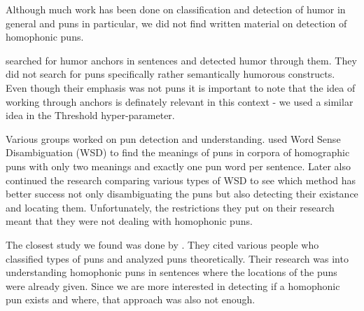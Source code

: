 \documentclass[11pt,a4paper]{article}
\begin{document}
Although much work has been done on classification and detection of humor in general and puns in particular, we did not find written material on detection of homophonic puns.

\citet{yang_lavie_dyer_hovy_2015} searched for humor anchors in sentences and detected humor through them. They did not search for puns specifically rather semantically humorous constructs. Even though their emphasis was not puns it is important to note that the idea of working through anchors is definately relevant in this context - we used a similar idea in the Threshold hyper-parameter.

Various groups worked on pun detection and understanding. \citet{miller_gurevych_2015} used Word Sense Disambiguation (WSD) to find the meanings of puns in corpora of homographic puns with only two meanings and exactly one pun word per sentence. Later \citet{miller_hempelmann_gurevych_2017} also continued the research comparing various types of WSD to see which method has better success not only disambiguating the puns but also detecting their existance and locating them. Unfortunately, the restrictions they put on their research meant that they were not dealing with homophonic puns.

The closest study we found was done by \citet{jaech_koncel-kedziorski_ostendorf_2016}. They cited various people who classified types of puns and analyzed puns theoretically. Their research was into understanding homophonic puns in sentences where the locations of the puns were already given. Since we are more interested in detecting if a homophonic pun exists and where, that approach was also not enough.

%
% 






\end{document}
